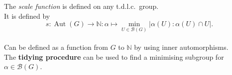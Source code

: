 \documentclass[preview]{standalone}
\begin{document}
The \textit{scale function} is defined on any t.d.l.c.\ group.\\It is defined by \[ s : \operatorname{Aut}(G) \to \mathbb{N} : \alpha \mapsto \min_{U \in \mathcal{B}(G)} |\alpha(U) : \alpha(U) \cap U |. \]\\Can be defined as a function from $G$ to $\mathbb{N}$ by using inner automorphisms.\\The \textbf{tidying procedure} can be used to find a minimising subgroup for $\alpha \in \mathcal{B}(G)$.\\
\end{document}

